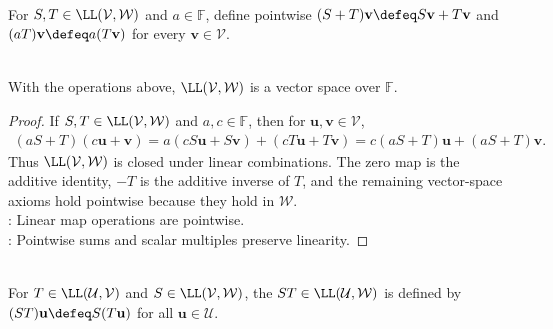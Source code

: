 \begin{definition} \\
For $S,T\in\LL(\mathcal{V},\mathcal{W})$ and $a\in\mathbb{F}$, define pointwise $(S+T)\mathbf{v}\defeq S\mathbf{v}+T\mathbf{v}$ and $(aT)\mathbf{v}\defeq a(T\mathbf{v})$ for every $\mathbf{v}\in\mathcal{V}$.
\end{definition}

\begin{proposition} \label{prop:linear-maps-form-vector-space} \\
With the operations above, $\LL(\mathcal{V},\mathcal{W})$ is a vector space over $\mathbb{F}$.
\begin{proof}
If $S,T\in\LL(\mathcal{V},\mathcal{W})$ and $a,c\in\mathbb{F}$, then for $\mathbf{u},\mathbf{v}\in\mathcal{V}$,
\begin{align}
(aS+T)(c\mathbf{u}+\mathbf{v})
=a(cS\mathbf{u}+S\mathbf{v})+(cT\mathbf{u}+T\mathbf{v})
=c(aS+T)\mathbf{u}+(aS+T)\mathbf{v}. \nonumber
\end{align}
Thus $\LL(\mathcal{V},\mathcal{W})$ is closed under linear combinations. The zero map is the additive identity, $-T$ is the additive inverse of $T$, and the remaining vector-space axioms hold pointwise because they hold in $\mathcal{W}$.\\
: Linear map operations are pointwise.\\
: Pointwise sums and scalar multiples preserve linearity.
\end{proof}
\end{proposition}

\begin{definition} \\
For $T\in\LL(\mathcal{U},\mathcal{V})$ and $S\in\LL(\mathcal{V},\mathcal{W})$, the  $ST\in\LL(\mathcal{U},\mathcal{W})$ is defined by $(ST)\mathbf{u}\defeq S(T\mathbf{u})$ for all $\mathbf{u}\in\mathcal{U}$.
\end{definition}

